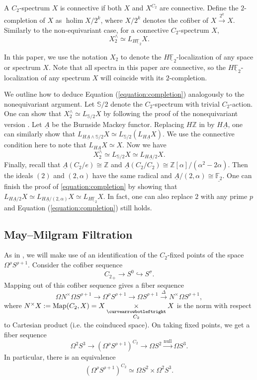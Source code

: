 \documentclass[]{amsart}  %
\theoremstyle{definition}
\numberwithin{equation}{section}
\numberwithin{figure}{section}
\DeclareMathOperator*{\holim}{holim}
\newcommand{\mF}{{\mathbb F}}
\newcommand{\umF}{\underline{\mF}}
\newcommand{\0}{\langle 0 \rangle}
\begin{document}
A $C_2$-spectrum $X$ is connective if both $X$ and $X^{C_2}$ are connective. Define the $2$-completion of $X$ as $\holim X/2^k$, where $X/2^k$ denotes the cofiber of $X \xrightarrow{2^k} X$. Similarly to the non-equivariant case, for a connective $C_2$-spectrum $X$,
\begin{equation}\label{equation:completion}
      X^\wedge_2 \simeq  L_{H\umF_2} X. 
\end{equation}

In this paper, we use the notation $X_{2}$ to denote the $H\umF_{2}$-localization of any space or spectrum $X$. Note that all spectra in this paper are connective, so the $H\umF_2$-localization of any spectrum $X$ will coincide with its $2$-completion.

We outline how to deduce Equation (\ref{equation:completion}) analogously to the nonequivariant argument. Let $\mathbb{S}/2$ denote the $C_2$-spectrum with trivial $C_2$-action. One can show that $X^\wedge_2 \simeq  L_{\mathbb{S}/2} X$ by following the proof of the nonequivariant version \cite[Proposition 2.5]{Bo1979}. 
Let $\underline{A}$ be the Burnside Mackey functor. Replacing $H\mathbb{Z}$ in \cite[Proposition 2.11]{Bo1979} by $H\underline{A}$, one can similarly show that $L_{H\underline{A}\wedge \mathbb{S}/2} X \simeq L_{\mathbb{S}/2}(L_{H\underline{A}} X)$. We use the connective condition here to note that $L_{H\underline{A}} X \simeq X$. Now we have $$X^\wedge_2 \simeq L_{\mathbb{S}/2} X \simeq L_{H\underline{A}/2} X .$$
Finally, recall that $\underline{A}(C_2/e)\cong \mathbb{Z}$ and $\underline{A}(C_2/C_2) \cong \mathbb{Z}[\alpha]/(\alpha^2-2\alpha)$. Then the ideals $(2)$ and $(2,\alpha)$ have the same radical and $\underline{A}/(2,\alpha) \cong \underline{\mathbb{F}_2}$. One can finish the proof of \ref{equation:completion} by showing that $L_{H\underline{A}/2} X \simeq L_{H\underline{A}/(2, \alpha)} X \simeq L_{H\umF_2} X$. In fact, one can also replace $2$ with any prime $p$ and Equation (\ref{equation:completion}) still holds.

\subsection{May--Milgram Filtration}
As in \cite[Section 4]{BW2018}, we will make use of an identification of the $C_2$-fixed points of the space $\Omega^\rho S^{\rho + 1}.$ Consider the cofiber sequence
$${C_2}_+ \to S^0 \hookrightarrow S^\sigma.$$
Mapping out of this cofiber sequence gives a fiber sequence
$$ \Omega N^\times \Omega S^{\rho + 1} \to \Omega^\rho S^{\rho + 1} \to \Omega S^{\rho + 1} \xrightarrow{\Delta} N^\times \Omega S^{\rho + 1},$$
where $N^\times X : = \text{Map}(C_2, X) = X \underset{\substack{ \curvearrowbotleftright \\ C_2}}{\times} X$ is the norm with respect to Cartesian product (i.e. the coinduced space). On taking fixed points, we get a fiber sequence
$$\Omega^{2} S^3 \xrightarrow[]{} (\Omega^\rho S^{\rho + 1})^{C_2} \to \Omega S^2 \xrightarrow[]{\text{null}} \Omega S^3. $$
In particular, there is an equivalence
\begin{align} \label{eq:fixedpts}
    (\Omega^\rho S^{\rho + 1})^{C_2} \simeq \Omega S^2 \times \Omega^2 S^3.
\end{align}
	
\end{document}

